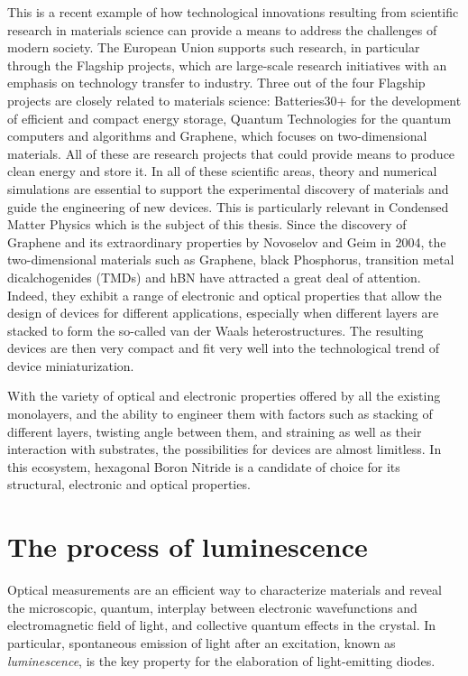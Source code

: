 This is a recent example of how technological innovations resulting from scientific research in materials science can provide a means to address the challenges of modern society. The European Union supports such research, in particular through the Flagship projects, which are large-scale research initiatives with an emphasis on technology transfer to industry. Three out of the four Flagship projects are closely related to materials science: Batteries30+ for the development of efficient and compact energy storage,\cite{batteries_flagship} Quantum Technologies\cite{quantum_flagship} for the quantum computers and algorithms and Graphene,\cite{graphene_flagship} which focuses on two-dimensional materials. All of these are research projects that could provide means to produce clean energy and store it. In all of these scientific areas, theory and numerical simulations are essential to support the experimental discovery of materials and guide the engineering of new devices. This is particularly relevant in Condensed Matter Physics which is the subject of this thesis. Since the discovery of Graphene and its extraordinary properties by Novoselov and Geim in 2004,\cite{novoselov2004electric} the two-dimensional materials such as Graphene, black Phosphorus, transition metal dicalchogenides (TMDs) and \acrfull{hBN} have attracted a great deal of attention. Indeed, they exhibit a range of electronic and optical properties that allow the design of devices for different applications, especially when different layers are stacked to form the so-called van der Waals heterostructures.\cite{geim2013van} The resulting devices are then very compact and fit very well into the technological trend of device miniaturization.

With the variety of optical and electronic properties offered by all the existing monolayers, and the ability to engineer them with factors such as stacking of different layers,\cite{sponza2018direct} twisting angle between them,\cite{latil2023structural, impellizzeri2022electronic} and straining\cite{blundo2021strain} as well as their interaction with substrates, the possibilities for devices are almost limitless. In this ecosystem, hexagonal Boron Nitride is a candidate of choice for its structural, electronic and optical properties.

% 


\section*{The process of luminescence}
Optical measurements are an efficient way to characterize materials and reveal the microscopic, quantum, interplay between electronic wavefunctions and electromagnetic field of light, and collective quantum effects in the crystal.\cite{dressel2002electrodynamics} In particular, spontaneous emission of light after an excitation, known as \textit{luminescence}, is the key property for the elaboration of light-emitting diodes.\cite{pelant2012luminescence}

